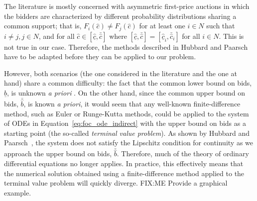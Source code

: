The literature is mostly concerned with asymmetric first-price auctions in which the bidders are characterized by different probability distributions sharing a common support; that is, $F_i(\hat{c})\neq F_j(\hat{c})$ for at least one $i\in N$ such that $i\neq j, j\in N$, and for all $\hat{c}\in [\underline{\hat{c}}, \bar{\hat{c}}]$ where $[\underline{\hat{c}}, \bar{\hat{c}}] = [\underline{\hat{c}}_i, \bar{\hat{c}}_i]$ for all $i\in N$. This is not true in our case. Therefore, the methods described in Hubbard and Paarsch~\cite{HubbardPaarsch2011} have to be adapted before they can be applied to our problem.

However, both scenarios (the one considered in the literature and the one at hand) share a common difficulty: the fact that the common lower bound on bids, $\underline{\hat{b}}$, is unknown \emph{a priori} \cite{HubbardPaarsch2011}. On the other hand, since the common upper bound on bids, $\bar{\hat{b}}$, is known \emph{a priori}, it would seem that any well-known finite-difference method, such as Euler or Runge-Kutta methods, could be applied to the system of ODEs in Equation~\eqref{eq:foc_ode_indirect} with the upper bound on bids as a starting point (the so-called \emph{terminal value problem}). As shown by Hubbard and Paarsch~\cite{HubbardPaarsch2011}, the system does not satisfy the Lipschitz condition for continuity as we approach the upper bound on bids, $\bar{\hat{b}}$. Therefore, much of the theory of ordinary differential equations no longer applies. In practice, this effectively means that the numerical solution obtained using a finite-difference method applied to the terminal value problem will quickly diverge. FIX:ME Provide a graphical example.

